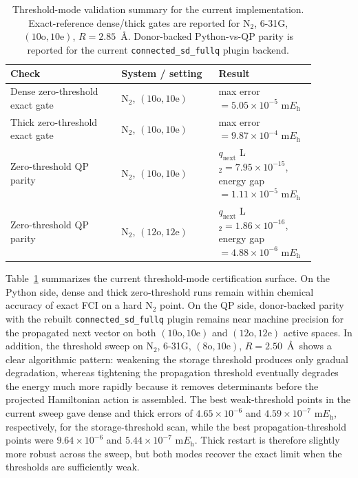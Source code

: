\documentclass[aip,jcp,preprint,longbibliography]{revtex4-2}
\begin{document}
\begin{table}[htbp]
\caption{Threshold-mode validation summary for the current implementation. Exact-reference dense/thick gates are reported for \(\mathrm{N}_2\), 6-31G, \((10\mathrm{o},10\mathrm{e})\), \(R=2.85\)~\AA. Donor-backed Python-vs-QP parity is reported for the current \texttt{connected\_sd\_fullq} plugin backend.}
\label{tab:thresholdgate}
\begin{ruledtabular}
\begin{tabular}{p{0.32\linewidth}p{0.28\linewidth}p{0.28\linewidth}}
Check & System / setting & Result \\
\hline
Dense zero-threshold exact gate & \(\mathrm{N}_2\), \((10\mathrm{o},10\mathrm{e})\) & max error \(= 5.05 \times 10^{-5}\) m\(E_{\mathrm{h}}\) \\
Thick zero-threshold exact gate & \(\mathrm{N}_2\), \((10\mathrm{o},10\mathrm{e})\) & max error \(= 9.87 \times 10^{-4}\) m\(E_{\mathrm{h}}\) \\
Zero-threshold QP parity & \(\mathrm{N}_2\), \((10\mathrm{o},10\mathrm{e})\) & \(q_{\mathrm{next}}\) L\(_2 = 7.95 \times 10^{-15}\), energy gap \(= 1.11 \times 10^{-5}\) m\(E_{\mathrm{h}}\) \\
Zero-threshold QP parity & \(\mathrm{N}_2\), \((12\mathrm{o},12\mathrm{e})\) & \(q_{\mathrm{next}}\) L\(_2 = 1.86 \times 10^{-16}\), energy gap \(= 4.88 \times 10^{-6}\) m\(E_{\mathrm{h}}\) \\
\end{tabular}
\end{ruledtabular}
\end{table}

Table~\ref{tab:thresholdgate} summarizes the current threshold-mode certification surface. On the Python side, dense and thick zero-threshold runs remain within chemical accuracy of exact FCI on a hard \(\mathrm{N}_2\) point. On the QP side, donor-backed parity with the rebuilt \texttt{connected\_sd\_fullq} plugin remains near machine precision for the propagated next vector on both \((10\mathrm{o},10\mathrm{e})\) and \((12\mathrm{o},12\mathrm{e})\) active spaces. In addition, the threshold sweep on \(\mathrm{N}_2\), 6-31G, \((8\mathrm{o},10\mathrm{e})\), \(R=2.50\)~\AA\ shows a clear algorithmic pattern: weakening the storage threshold produces only gradual degradation, whereas tightening the propagation threshold eventually degrades the energy much more rapidly because it removes determinants before the projected Hamiltonian action is assembled. The best weak-threshold points in the current sweep gave dense and thick errors of \(4.65 \times 10^{-6}\) and \(4.59 \times 10^{-7}\) m\(E_{\mathrm{h}}\), respectively, for the storage-threshold scan, while the best propagation-threshold points were \(9.64 \times 10^{-6}\) and \(5.44 \times 10^{-7}\) m\(E_{\mathrm{h}}\). Thick restart is therefore slightly more robust across the sweep, but both modes recover the exact limit when the thresholds are sufficiently weak.
\end{document}

